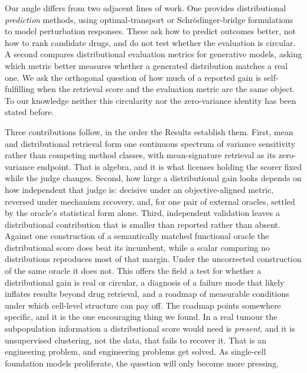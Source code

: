 \documentclass[11pt,letterpaper]{article}
\begin{document}
Our angle differs from two adjacent lines of work. One provides distributional \emph{prediction} methods, using optimal-transport or Schr\"odinger-bridge formulations to model perturbation responses\cite{CellOT,Departures}. These ask how to predict outcomes better, not how to rank candidate drugs, and do not test whether the evaluation is circular. A second compares distributional evaluation metrics for generative models\cite{OptimalMetrics,StandardizedEval}, asking which metric better measures whether a generated distribution matches a real one. We ask the orthogonal question of how much of a reported gain is self-fulfilling when the retrieval score and the evaluation metric are the same object. To our knowledge neither this circularity nor the zero-variance identity has been stated before.

Three contributions follow, in the order the Results establish them. First, mean and distributional retrieval form one continuous spectrum of variance sensitivity rather than competing method classes, with mean-signature retrieval as its zero-variance endpoint. That is algebra, and it is what licenses holding the scorer fixed while the judge changes. Second, how large a distributional gain looks depends on how independent that judge is: decisive under an objective-aligned metric, reversed under mechanism recovery, and, for one pair of external oracles, settled by the oracle's statistical form alone. Third, independent validation leaves a distributional contribution that is smaller than reported rather than absent. Against one construction of a semantically matched functional oracle the distributional score does beat its incumbent, while a scalar comparing no distributions reproduces most of that margin. Under the uncorrected construction of the same oracle it does not. This offers the field a test for whether a distributional gain is real or circular, a diagnosis of a failure mode that likely inflates results beyond drug retrieval\cite{ref16,ref17}, and a roadmap of measurable conditions under which cell-level structure can pay off. The roadmap points somewhere specific, and it is the one encouraging thing we found. In a real tumour the subpopulation information a distributional score would need is \emph{present}, and it is unsupervised clustering, not the data, that fails to recover it. That is an engineering problem, and engineering problems get solved. As single-cell foundation models proliferate, the question will only become more pressing.

\end{document}
